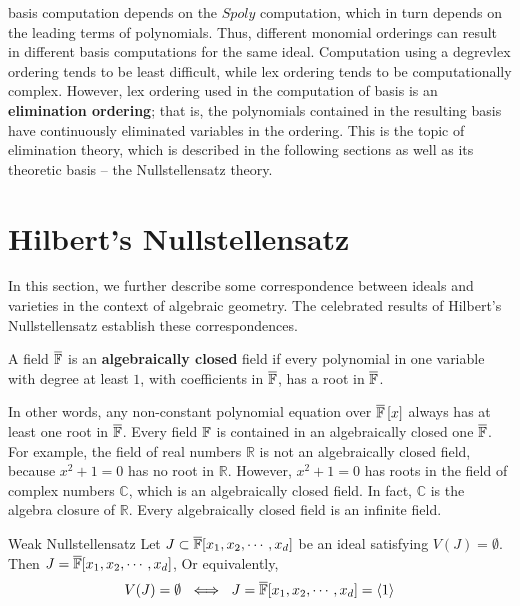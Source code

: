\Grobner basis computation depends on the $Spoly$ computation, which in turn 
depends on the leading terms of polynomials. Thus, different monomial 
orderings can result in different \Grobner basis computations for the 
same ideal. Computation using a degrevlex ordering tends to be least 
difficult, while lex ordering tends to be computationally complex. However, 
lex ordering used in the computation of \Grobner basis is an {\bf elimination
ordering}; that is, the polynomials contained in the resulting \Grobner basis
have continuously eliminated variables in the ordering. This is the topic of 
elimination theory, which is described in the following sections as well as 
its theoretic basis -- the Nullstellensatz theory.

\section{Hilbert's Nullstellensatz}

In this section, we further describe some correspondence between ideals and 
varieties in the context of algebraic geometry. The celebrated results of 
Hilbert's Nullstellensatz establish these correspondences.

\begin{Definition}\label{def:acf}
A field $\overline {{\mathbb{F}}}$ is an {\bf algebraically closed} field if every  
polynomial in one variable with degree at least $1$, with coefficients 
in $\overline {{\mathbb{F}}}$, has a root in $\overline {{\mathbb{F}}}$. 
\end{Definition}
In other words, any non-constant polynomial equation over 
$\overline {{\mathbb{F}}}\left[x\right]$ always has at least one root 
in $\overline {{\mathbb{F}}}$. Every field ${\mathbb{F}}$ is contained in an algebraically 
closed one $\overline {{\mathbb{F}}}$. 
For example, the field of real numbers $\mathbb{R}$ is not an algebraically closed 
field, because $x^2+1=0$ has no root in $\mathbb{R}$. 
However, $x^2+1=0$ has roots in the field of 
complex numbers $\mathbb{C}$, which is an algebraically closed field. 
In fact, $\mathbb{C}$ is the algebra closure of $\mathbb{R}$. 
Every algebraically closed field is an infinite field. 

\begin{Theorem}{Weak Nullstellensatz}
Let $J \subset \overline {{\mathbb{F}}}[x_1, x_2, \cdots, x_d]$ 
be an ideal satisfying $V(J)=\emptyset$. 
Then $J=\overline {{\mathbb{F}}}[x_1, x_2, \cdots, x_d]$, Or equivalently, 
\begin{equation}
V(J)=\emptyset\ \iff\ J=\overline {{\mathbb{F}}}[x_1, x_2, \cdots, x_d]=\langle 1 \rangle 
\end{equation}
\end{Theorem}

